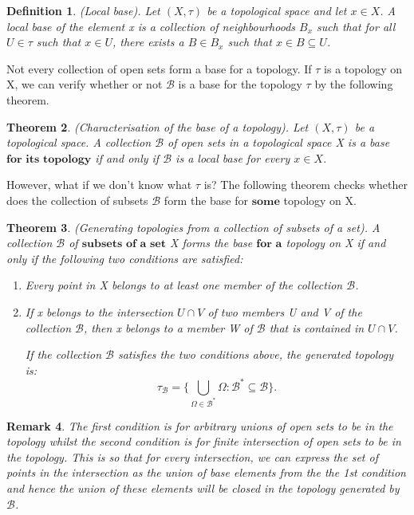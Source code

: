 \documentclass[twoside]{article}
\newcounter{lecnum}
\newtheorem{theorem}{Theorem}[lecnum]
\newtheorem{definition}[theorem]{Definition}
\newtheorem{remark}[theorem]{Remark}
\begin{document}
\begin{definition}(Local base). Let $(X, \tau)$ be a topological space and let $x \in X$. A local base of the element x is a collection of neighbourhoods $B_x$ such that for all $U \in \tau$ such that $x \in U$, there exists a $B \in B_x$ such that $x \in B \subseteq U$.
\end{definition}

Not every collection of open sets form a base for a topology. If $\tau$ is a topology on X, we can verify whether or not $\mathcal{B}$ is a base for the topology $\tau$ by the following theorem. 

\begin{theorem}(Characterisation of the base of a topology). Let $(X, \tau)$ be a topological space. A collection $\mathcal{B}$ of open sets in a topological space X is a base $\textbf{for its topology}$ if and only if $\mathcal{B}$ is a local base for every $x \in X$.
\end{theorem}

However, what if we don't know what $\tau$ is? The following theorem checks whether does the collection of subsets $\mathcal{B}$ form the base for $\textbf{some}$ topology on X.

\begin{theorem}(Generating topologies from a collection of subsets of a set). A collection $\mathcal{B}$ of $\textbf{subsets of a set}$ X forms the base $\textbf{for a}$ topology on X if and only if the following two conditions are satisfied:
\begin{enumerate} 
\item Every point in X belongs to at least one member of the collection $\mathcal{B}$.
\item If x belongs to the intersection $U \cap V$ of two members U and V of the collection $\mathcal{B}$, then x belongs to a member W of $\mathcal{B}$ that is contained in $U \cap V$.

If the collection $\mathcal{B}$ satisfies the two conditions above, the generated topology is:
$$
\tau_{\mathcal{B}} = \{\bigcup_{\Omega \in \mathcal{B}^*}\Omega: \mathcal{B}^* \subseteq \mathcal{B}  \}.
$$
\end{enumerate}
\end{theorem}

\begin{remark}The first condition is for arbitrary unions of open sets to be in the topology whilst the second condition is for finite intersection of open sets to be in the topology. This is so that for every intersection, we can express the set of points in the intersection as the union of base elements from the the 1st condition and hence the union of these elements will be closed in the topology generated by $\mathcal{B}$.
\end{remark}
\end{document}
